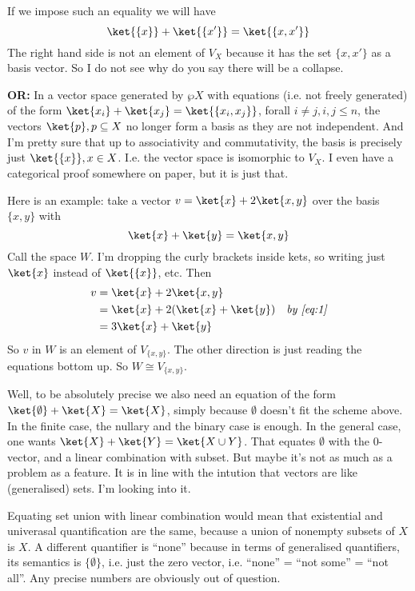 If we impose such an equality we will have
\[
\ket{\{x\}} +  \ket{\{x'\}} = \ket{\{x,x'\}}
\]
The right hand side is not an element of $V_X$ because it has the set $\{x,x'\}$ as a basis vector.  So I do not see why do you say there will be a collapse. 


\textbf{OR:} In a vector space generated by $\wp X$ with equations
(i.e. not freely generated) of the form $\ket{x_i}+\ket{x_j} =
\ket{\{x_i,x_j\}}$, forall $i\neq j, i,j \leq n$, the vectors
$\ket{p}, p\subseteq X$ no longer form a basis as they are not
independent. And I'm pretty sure that up to associativity and
commutativity, the basis is precisely just $\ket{\{x\}}, x\in X$. I.e. the
vector space is isomorphic to $V_X$.
I even have a categorical proof somewhere on paper, but it is just
that. 

Here is an example: take a vector $v = \ket{x} + 2\ket{x,y}$ over
the basis $\{x,y\}$ with 
\begin{equation}\label{eq:1}
\ket{x} + \ket{y} =\ket{x,y}
\end{equation}
%
Call the space $W$.
I'm dropping the curly brackets inside kets, so writing
just $\ket{x}$ instead of $\ket{\{x\}}$, etc.  Then
\begin{align*}
v &= \ket{x} + 2\ket{x,y} \\
& = \ket{x} + 2(\ket{x} + \ket{y}) & \text{\textit{by \eqref{eq:1}}}\\
& = 3\ket{x} + \ket{y}
\end{align*}
%
So $v$ in $W$ is an element of $V_{\{x,y\}}$. The other direction is
just reading the equations bottom up. So $W \cong V_{\{x,y\}}$. 

Well, to be absolutely precise we also need an equation of the form
$\ket{\emptyset}+\ket{X} = \ket{X}$, simply because $\emptyset$
doesn't fit the scheme above. In the finite case, the nullary and the
binary case is enough. In the general case, one wants $\ket{X}+\ket{Y}
= \ket{X \cup Y}$. That equates $\emptyset$ with the $0$-vector, and a
linear combination with subset. But maybe it's not as much as a
problem as a feature. It is in line with the intution that vectors are
like (generalised) sets. I'm looking into it. 

Equating set union with linear combination would mean that existential
and univerasal quantification are the same, because a union of
nonempty subsets of $X$ is $X$. A different quantifier is ``none''
because in terms of generalised quantifiers, its semantics is $\{
\emptyset \}$, i.e. just the zero vector, i.e. ``none'' = ``not some''
= ``not all''. Any precise numbers are obviously out of question. 

